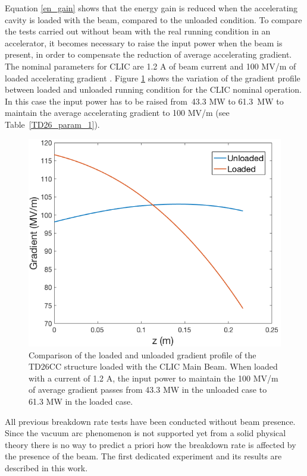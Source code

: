 Equation \ref{en_gain} shows that the energy gain is reduced when the accelerating cavity is loaded with the beam, compared to the unloaded condition. To compare the tests carried out without beam with the real running condition in an accelerator, it becomes necessary to raise the input power when the beam is present, in order to compensate the reduction of average accelerating gradient. The nominal parameters for CLIC are 1.2 A of beam current and 100 MV/m of loaded accelerating gradient \cite{CLIC:cdr}. Figure \ref{100mvm} shows the variation of the gradient profile between loaded and unloaded running condition for the CLIC nominal operation. In this case the input power has to be raised from~43.3 MW to 61.3~MW to maintain the average accelerating gradient to 100 MV/m (see Table~\ref{TD26_param_1}).

\begin{figure}[h]
\centering 
\includegraphics[scale=0.45]{pictures/grad_vs_IP.png}
\caption{Comparison of the loaded and unloaded gradient profile of the TD26CC structure loaded with the CLIC Main Beam. When loaded with a current of 1.2 A, the input power to maintain the 100 MV/m of average gradient passes from 43.3 MW in the unloaded case to 61.3 MW in the loaded case. }
\label{100mvm}
\end{figure}

All previous breakdown rate tests have been conducted without  beam presence. Since the vacuum arc phenomenon is not supported yet from a solid physical theory there is no way to predict a priori how the breakdown rate is affected by the presence of the beam. The first dedicated experiment and its results are described in this work.

